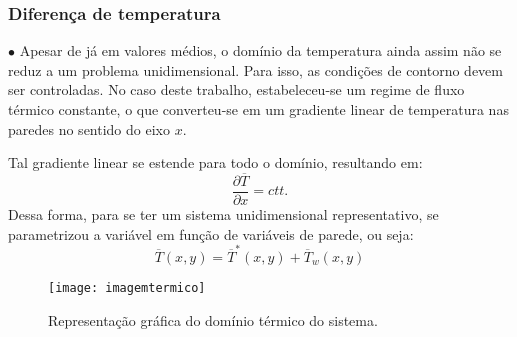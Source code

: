 \documentclass[xcolor=dvipsnames,10pt,aspectratio=169]{beamer}
\begin{document}
		\begin{frame}
			\frametitle{Diferença de temperatura}
			$\bullet$ Apesar de já em valores médios, o domínio da temperatura ainda assim não se reduz a um problema unidimensional. Para isso, as condições de contorno devem ser controladas. No caso deste trabalho, estabeleceu-se um regime de fluxo térmico constante, o que converteu-se em um gradiente linear de temperatura nas paredes no sentido do eixo $x$.  \\
			\begin{minipage}[h!]{0.36\textwidth}
				Tal gradiente linear se estende para todo o domínio, resultando em:
				\begin{equation}
				\frac{\partial \overline{T}}{\partial x} = ctt.
				\end{equation}
				Dessa forma, para se ter um sistema unidimensional representativo, se parametrizou a variável em função de variáveis de parede, ou seja:
				\begin{equation}
				\overline{T}(x,y) = \overline{T}^\ast(x , y) + \overline{T}_w(x , y)
				\end{equation}
			\end{minipage}\hfill
			\begin{minipage}[h!]{0.60\textwidth}
			\begin{figure}
				\centering
				\texttt{[image: imagemtermico]}
				\caption{Representação gráfica do domínio térmico do sistema.}
				\label{temperatura}
			\end{figure}
			\end{minipage}
		\end{frame}
		
		
		
		
		
\end{document}

